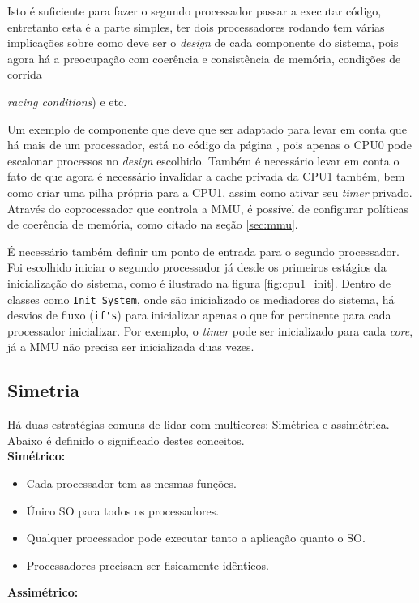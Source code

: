 Isto é suficiente para fazer o segundo processador passar a executar código, entretanto esta é a parte simples, ter dois processadores rodando tem várias implicações sobre como deve ser o \emph{design} de cada componente do sistema, pois agora há a preocupação com coerência e consistência de memória, condições de corrida {\emph{racing conditions}) e etc.

Um exemplo de componente que deve que ser adaptado para levar em conta que há mais de um processador, está no código da página \pageref{int_handler}, pois apenas o CPU0 pode escalonar processos no \emph{design} escolhido. Também é necessário levar em conta o fato de que agora é necessário invalidar a cache privada da CPU1 também, bem como criar uma pilha própria para a CPU1, assim como ativar seu \emph{timer} privado. Através do coprocessador que controla a MMU, é possível de configurar políticas de coerência de memória, como citado na seção \ref{sec:mmu}.


É necessário também definir um ponto de entrada para o segundo processador.
Foi escolhido iniciar o segundo processador já desde os primeiros estágios da inicialização do sistema, como é ilustrado na figura \ref{fig:cpu1_init}. Dentro de classes como \verb+Init_System+, onde são inicializado os mediadores do sistema, há desvios de fluxo (\verb=if's=) para inicializar apenas o que for pertinente para cada processador inicializar. Por exemplo, o \emph{timer} pode ser inicializado para cada \emph{core}, já a MMU não precisa ser inicializada duas vezes.

\subsection{Simetria}

Há duas estratégias comuns de lidar com multicores: Simétrica e assimétrica. Abaixo é definido o significado destes conceitos.\\[10pt]
\textbf{Simétrico:}

		\begin{itemize}
			\item Cada processador tem as mesmas funções.
			\item Único SO para todos os processadores.
			\item Qualquer processador pode executar tanto a aplicação quanto o SO.
			\item Processadores precisam ser fisicamente idênticos.
		\end{itemize}
\textbf{Assimétrico:}

}
